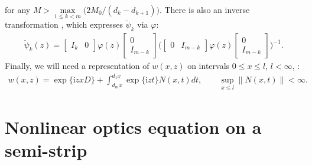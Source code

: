 \documentclass[11pt]{article}
\newcommand{\I}{\mathrm{i}}
\numberwithin{equation}{section}
\begin{document}
for any $M>\max\limits_{1\leq k<m}\big(2M_0/(d_k-d_{k+1})\big)$. There is also an inverse transformation \cite[Remark~4.6]{SaSaR}, which expresses $\breve \psi_k$ via $\varphi$:
\begin{gather}
  \breve\psi_k^{\,} (z)
= \begin{bmatrix} I_k & 0\end{bmatrix}
 \varphi (z)
 \left[
  \begin{matrix}
    0  \\
    I_{m-k}
  \end{matrix}
 \right]
 \biggl(
 \begin{bmatrix} 0 & I_{m-k}\end{bmatrix}
  \varphi (z)
  \left[
  \begin{matrix}
    0  \\
    I_{m-k}
  \end{matrix}
  \right]
 \biggr)^{-1} .
 \label{NW17}
\end{gather}
Finally, we will need a representation of $w(x,z)$ on intervals $0\leq x\leq l$, $l<\infty$, \cite[equation~(4.37)]{SaSaR} :
\begin{gather}
  w(x,z) = \exp \{ \I z x D\}
    + \int_{d_m x}^{d_1 x}
           \exp \{\I zt\}
     N(x,t)
     dt, \qquad \sup_{x\leq l} \| N(x,t) \| < \infty.
 \label{NW18}
\end{gather}


\setcounter{section}{3}
\setcounter{subsection}{0}
\setcounter{subsubsection}{0}
\setcounter{Theorem}{7}
\setcounter{equation}{3}
\section{Nonlinear optics equation on a semi-strip} \label{NW}
\end{document}
